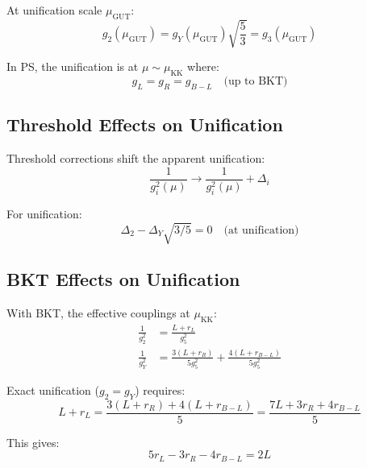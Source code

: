 \documentclass[11pt,a4paper]{article}
\begin{document}
At unification scale $\mu_{\text{GUT}}$:
\begin{equation}
\label{eq:unification}
g_2(\mu_{\text{GUT}}) = g_Y(\mu_{\text{GUT}})\sqrt{\frac{5}{3}} = g_3(\mu_{\text{GUT}})
\end{equation}

In PS, the unification is at $\mu \sim \mu_{\text{KK}}$ where:
\begin{equation}
\label{eq:ps-unif}
g_L = g_R = g_{B-L} \quad \text{(up to BKT)}
\end{equation}

\subsection{Threshold Effects on Unification}
\label{subsec:threshold-unif}

Threshold corrections shift the apparent unification:
\begin{equation}
\label{eq:threshold-shift}
\frac{1}{g_i^2(\mu)} \to \frac{1}{g_i^2(\mu)} + \Delta_i
\end{equation}

For unification:
\begin{equation}
\label{eq:delta-constraint}
\Delta_2 - \Delta_Y\sqrt{3/5} = 0 \quad \text{(at unification)}
\end{equation}

\subsection{BKT Effects on Unification}
\label{subsec:bkt-unif}

With BKT, the effective couplings at $\mu_{\text{KK}}$:
\begin{align}
\label{eq:g2-bkt}
\frac{1}{g_2^2} &= \frac{L + r_L}{g_5^2} \\
\label{eq:gY-bkt}
\frac{1}{g_Y^2} &= \frac{3(L + r_R)}{5g_5^2} + \frac{4(L + r_{B-L})}{5g_5^2}
\end{align}

Exact unification ($g_2 = g_Y$) requires:
\begin{equation}
\label{eq:exact-unif-cond}
L + r_L = \frac{3(L + r_R) + 4(L + r_{B-L})}{5} = \frac{7L + 3r_R + 4r_{B-L}}{5}
\end{equation}

This gives:
\begin{equation}
\label{eq:bkt-unif-cond}
5r_L - 3r_R - 4r_{B-L} = 2L
\end{equation}
\end{document}
